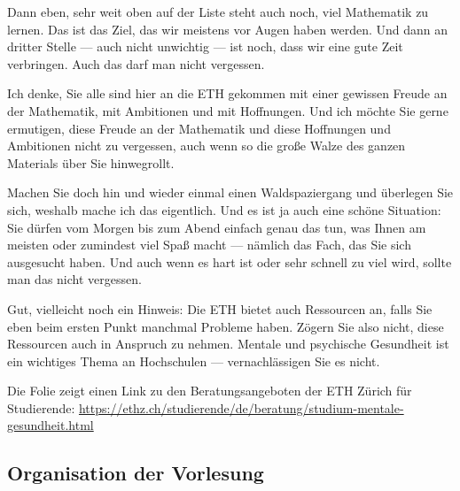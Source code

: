 \begin{spoken-clean}[00:01:08 - 00:02:41]
Dann eben, sehr weit oben auf der Liste steht auch noch, viel Mathematik zu lernen. Das ist das Ziel, das wir meistens vor Augen haben werden. Und dann an dritter Stelle --- auch nicht unwichtig --- ist noch, dass wir eine gute Zeit verbringen. Auch das darf man nicht vergessen.

Ich denke, Sie alle sind hier an die ETH gekommen mit einer gewissen Freude an der Mathematik, mit Ambitionen und mit Hoffnungen. Und ich möchte Sie gerne ermutigen, diese Freude an der Mathematik und diese Hoffnungen und Ambitionen nicht zu vergessen, auch wenn so die große Walze des ganzen Materials über Sie hinwegrollt.

Machen Sie doch hin und wieder einmal einen Waldspaziergang und überlegen Sie sich, weshalb mache ich das eigentlich. Und es ist ja auch eine schöne Situation: Sie dürfen vom Morgen bis zum Abend einfach genau das tun, was Ihnen am meisten oder zumindest viel Spaß macht --- nämlich das Fach, das Sie sich ausgesucht haben. Und auch wenn es hart ist oder sehr schnell zu viel wird, sollte man das nicht vergessen.

Gut, vielleicht noch ein Hinweis: Die ETH bietet auch Ressourcen an, falls Sie eben beim ersten Punkt manchmal Probleme haben. Zögern Sie also nicht, diese Ressourcen auch in Anspruch zu nehmen. Mentale und psychische Gesundheit ist ein wichtiges Thema an Hochschulen --- vernachlässigen Sie es nicht.
\end{spoken-clean}

\begin{meta-note}
Die Folie zeigt einen Link zu den Beratungsangeboten der ETH Zürich für Studierende:
\url{https://ethz.ch/studierende/de/beratung/studium-mentale-gesundheit.html}
\end{meta-note}

\subsection{Organisation der Vorlesung}

